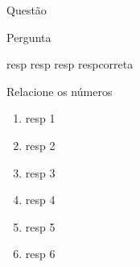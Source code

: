 \documentclass[pdftex, brazil, 12pt, oneside, addpoints]{exam}
\newcommand{\umalinha}{\fillwithlines{0.25in}}
\newcommand{\vf}[1][{}]{%
  \fillin[#1][0.25in]%
}
\begin{document}
\begin{questions}
\question
Questão
\ifprintanswers
\begin{solution}
\end{solution}
\else
{}
\fi

\question
Pergunta
\begin{checkboxes}
  \choice resp
  \choice resp
  \choice resp
  \CorrectChoice respcorreta
\end{checkboxes}

\question
Relacione os números
\begin{enumerate}
\item resp 1
\item resp 2
\item resp 3
\item resp 4
\item resp 5
\item resp 6
\end{enumerate}
\end{questions}
\end{document}
